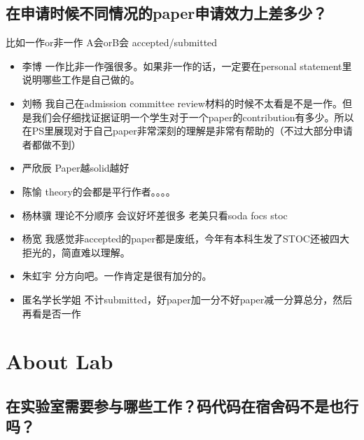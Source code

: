 \documentclass{vivid_layout}
\begin{document}
\subsection{在申请时候不同情况的paper申请效力上差多少？}
比如一作or非一作 A会orB会 accepted/submitted
\begin{itemize}
\item  { 李博}  \quad 一作比非一作强很多。如果非一作的话，一定要在personal statement里说明哪些工作是自己做的。
\item  { 刘畅}  \quad 我自己在admission committee review材料的时候不太看是不是一作。但是我们会仔细找证据证明一个学生对于一个paper的contribution有多少。所以在PS里展现对于自己paper非常深刻的理解是非常有帮助的（不过大部分申请者都做不到）
\item  { 严欣辰}  \quad Paper越solid越好
\item  { 陈愉}  \quad theory的会都是平行作者。。。。
\item  { 杨林骥}  \quad 理论不分顺序 会议好坏差很多 老美只看soda focs stoc
\item  { 杨宽}  \quad 我感觉非accepted的paper都是废纸，今年有本科生发了STOC还被四大拒光的，简直难以理解。
\item  { 朱虹宇}  \quad 分方向吧。一作肯定是很有加分的。
\item {\name 匿名学长学姐}  \quad 不计submitted，好paper加一分不好paper减一分算总分，然后再看是否一作
\end{itemize}

\section{About Lab}
\addtocounter{section}{1}
\setcounter{subsection}{0}
\subsection{在实验室需要参与哪些工作？码代码在宿舍码不是也行吗？}
\end{document}
